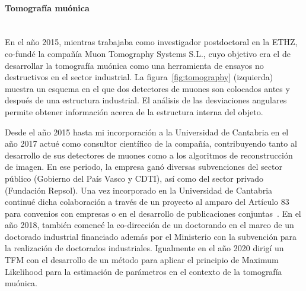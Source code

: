 \paragraph{Tomografía muónica\\\\}

En el año 2015, mientras trabajaba como investigador postdoctoral en la ETHZ, co-fundé la compañía Muon Tomography Systems S.L., cuyo objetivo era el de desarrollar la tomografía muónica como una herramienta de ensayos no destructivos en el sector industrial. La figura~\ref{fig:tomography} (izquierda) muestra un esquema en el que dos detectores de muones son colocados antes y después de una estructura industrial. El análisis de las desviaciones angulares permite obtener información acerca de la estructura interna del objeto.

Desde el año 2015 hasta mi incorporación a la Universidad de Cantabria en el año 2017 actué como consultor científico de la compañía, contribuyendo tanto al desarrollo de sus detectores de muones como a los algoritmos de reconstrucción de imagen. En ese periodo, la empresa ganó diversas subvenciones del sector público (Gobierno del País Vasco y CDTI), así como del sector privado (Fundación Repsol). Una vez incorporado en la Universidad de Cantabria continué dicha colaboración a través de un proyecto al amparo del Artículo 83 para convenios con empresas o en el desarrollo de publicaciones conjuntas~\cite{bib:muontomography}. En el año 2018, también comencé la co-dirección de un doctorando en el marco de un doctorado industrial financiado además por el Ministerio con la subvención para la realización de doctorados industriales. Igualmente en el año 2020 dirigí un TFM con el desarrollo de un método para aplicar el principio de Maximum Likelihood para la estimación de parámetros en el contexto de la tomografía muónica.


